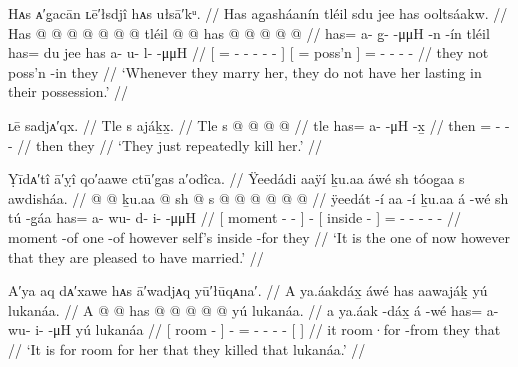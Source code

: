 \ex\label{ex:89-53-marry-not-last-long}%
%
\begingl
	\glpreamble	Hᴀs ᴀ′g̣acān ʟē′łsdjî hᴀs ułsā′kᵘ. //
	\glpreamble	Has ag̱asháanín tléil sdu jee has ooltsáakw. //
	\gla	{} Has @  @ {} @ {} @ {} @ {} @ {} @ {} {}
		tléil {}  @ {}  @ {} {}
		has @  @ {} @ {} @ {} @ {} //
	\glb	{} has= a- {} g̱-  -μμH -n -ín {}
		tléil {} has= du jee {} {}
		has a- u- l-  -μμH //
	\glc	{}[ = - \· -  - - - {}]
		 {}[ =  poss’n \· {}]
		= - - -  - //
	\gld	{} they  {} {} {} {} {} {} {}
		not {}  {} poss’n -in {}
		they  {} {} {} {}  //
	\glft	‘Whenever they marry her, they do not have her lasting in their possession.’
		//
\endgl
\xe

\ex\label{ex:89-54-repeatedly-kill}%
%
\begingl
	\glpreamble	ʟē sadjᴀ′qx. //
	\glpreamble	Tle s ajáḵx̱. //
	\gla	Tle s @  @ {} @ {} @ {} //
	\glb	tle has= a-  -μH -x̱ //
	\glc	then = -  - - //
	\gld	then they  {} {} {} //
	\glft	‘They just repeatedly kill her.’
		//
\endgl
\xe

\ex\label{ex:89-55-pleased-to-marry}%
%
\begingl
	\glpreamble	Ỵīdᴀ′tî ā′ỵî qo′aawe ctū′gas a′odîca. //
	\glpreamble	Ÿeedádi aaÿí ḵu.aa áwé sh tóog̱aa s awdisháa. //
	\gla	{}  @ {}  @ {} {}
		ḵu.aa  @ {}
		{} sh  @ {} {}
		s @  @ {} @ {} @ {} @ {} @ {} //
	\glb	{} ÿeedát -í aa -í {}
		ḵu.aa á -wé
		{} sh tú -g̱áa {}
		has= a- wu- d- i-  -μμH //
	\glc	{}[ moment -  - {}]
		  -
		{}[  inside - {}]
		= - - - -  - //
	\gld	{} moment -of one -of {}
		however  {}
		{} self’s inside -for {}
		they  {} {} {} {} {} //
	\glft	‘It is the one of now however that they are pleased to have married.’
		//
\endgl
\xe

\ex\label{ex:89-56-killed-lukanaa}%
%
\begingl
	\glpreamble	A′ya aq dᴀ′xawe hᴀs ā′wadjᴀq yū′łūqᴀna′. //
	\glpreamble	A ya.áakdáx̱ áwé has aawajáḵ yú lukanáa. //
	\gla	{} A  @ {} {}
		 @ {}
		has @  @ {} @ {} @ {} @ {}
		{} yú lukanáa. {} //
	\glb	{} a ya.áak -dáx̱ {}
		á -wé
		has= a- wu- i-  -μH
		{} yú lukanáa {} //
	\glc	{}[  room - {}]
		 -
		= - - -  -
		{}[   {}] //
	\gld	{} it room·for -from {}
		 {}
		they  {} {} {} {} 
		{} that  {} //
	\glft	‘It is for room for her that they killed that lukanáa.’
		//
\endgl
\xe

